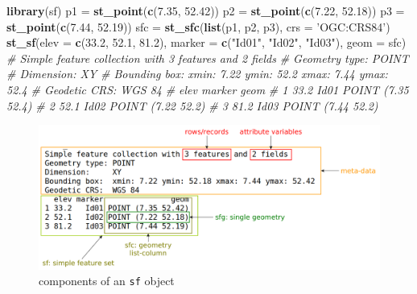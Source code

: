 \documentclass[]{book}
\newenvironment{Shaded}{\begin{snugshade}}{\end{snugshade}}
\newcommand{\CommentTok}[1]{\textcolor[rgb]{0.56,0.35,0.01}{\textit{#1}}}
\newcommand{\DataTypeTok}[1]{\textcolor[rgb]{0.13,0.29,0.53}{#1}}
\newcommand{\FloatTok}[1]{\textcolor[rgb]{0.00,0.00,0.81}{#1}}
\newcommand{\KeywordTok}[1]{\textcolor[rgb]{0.13,0.29,0.53}{\textbf{#1}}}
\newcommand{\NormalTok}[1]{#1}
\newcommand{\StringTok}[1]{\textcolor[rgb]{0.31,0.60,0.02}{#1}}
\begin{document}
\begin{Shaded}
\begin{Highlighting}[]
\KeywordTok{library}\NormalTok{(sf)}
\NormalTok{p1 =}\StringTok{ }\KeywordTok{st_point}\NormalTok{(}\KeywordTok{c}\NormalTok{(}\FloatTok{7.35}\NormalTok{, }\FloatTok{52.42}\NormalTok{))}
\NormalTok{p2 =}\StringTok{ }\KeywordTok{st_point}\NormalTok{(}\KeywordTok{c}\NormalTok{(}\FloatTok{7.22}\NormalTok{, }\FloatTok{52.18}\NormalTok{))}
\NormalTok{p3 =}\StringTok{ }\KeywordTok{st_point}\NormalTok{(}\KeywordTok{c}\NormalTok{(}\FloatTok{7.44}\NormalTok{, }\FloatTok{52.19}\NormalTok{))}
\NormalTok{sfc =}\StringTok{ }\KeywordTok{st_sfc}\NormalTok{(}\KeywordTok{list}\NormalTok{(p1, p2, p3), }\DataTypeTok{crs =} \StringTok{'OGC:CRS84'}\NormalTok{)}
\KeywordTok{st_sf}\NormalTok{(}\DataTypeTok{elev =} \KeywordTok{c}\NormalTok{(}\FloatTok{33.2}\NormalTok{, }\FloatTok{52.1}\NormalTok{, }\FloatTok{81.2}\NormalTok{), }\DataTypeTok{marker =} \KeywordTok{c}\NormalTok{(}\StringTok{"Id01"}\NormalTok{, }\StringTok{"Id02"}\NormalTok{, }\StringTok{"Id03"}\NormalTok{),}
      \DataTypeTok{geom =}\NormalTok{ sfc)}
\CommentTok{# Simple feature collection with 3 features and 2 fields}
\CommentTok{# Geometry type: POINT}
\CommentTok{# Dimension:     XY}
\CommentTok{# Bounding box:  xmin: 7.22 ymin: 52.2 xmax: 7.44 ymax: 52.4}
\CommentTok{# Geodetic CRS:  WGS 84}
\CommentTok{#   elev marker              geom}
\CommentTok{# 1 33.2   Id01 POINT (7.35 52.4)}
\CommentTok{# 2 52.1   Id02 POINT (7.22 52.2)}
\CommentTok{# 3 81.2   Id03 POINT (7.44 52.2)}
\end{Highlighting}
\end{Shaded}



\begin{figure}

{\centering \includegraphics[width=1\linewidth]{images/sf_obj} 

}

\caption{components of an \texttt{sf} object}\label{fig:sfobj}
\end{figure}
\end{document}
